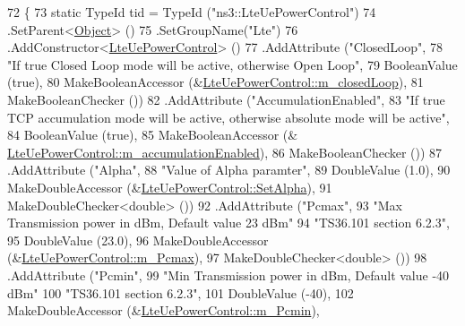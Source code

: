 \begin{DoxyCode}
72 \{
73   \textcolor{keyword}{static} TypeId tid = TypeId (\textcolor{stringliteral}{"ns3::LteUePowerControl"})
74     .SetParent<\hyperlink{classns3_1_1Object_a40860402e64d8008fb42329df7097cdb}{Object}> ()
75     .SetGroupName(\textcolor{stringliteral}{"Lte"})
76     .AddConstructor<\hyperlink{classns3_1_1LteUePowerControl_a98634f9063bfe469a1b025b6f6bbd02e}{LteUePowerControl}> ()
77     .AddAttribute (\textcolor{stringliteral}{"ClosedLoop"},
78                    \textcolor{stringliteral}{"If true Closed Loop mode will be active, otherwise Open Loop"},
79                    BooleanValue (\textcolor{keyword}{true}),
80                    MakeBooleanAccessor (&\hyperlink{classns3_1_1LteUePowerControl_a0bb35bbebbdd20c4c6140b984332367b}{LteUePowerControl::m\_closedLoop}),
81                    MakeBooleanChecker ())
82     .AddAttribute (\textcolor{stringliteral}{"AccumulationEnabled"},
83                    \textcolor{stringliteral}{"If true TCP accumulation mode will be active, otherwise absolute mode will be active"},
84                    BooleanValue (\textcolor{keyword}{true}),
85                    MakeBooleanAccessor (&
      \hyperlink{classns3_1_1LteUePowerControl_afb48a41c71eee57f8e624420aad0d073}{LteUePowerControl::m\_accumulationEnabled}),
86                    MakeBooleanChecker ())
87     .AddAttribute (\textcolor{stringliteral}{"Alpha"},
88                    \textcolor{stringliteral}{"Value of Alpha paramter"},
89                    DoubleValue (1.0),
90                    MakeDoubleAccessor (&\hyperlink{classns3_1_1LteUePowerControl_adca4253fbb3f2047ee1859a5b4bf0ca0}{LteUePowerControl::SetAlpha}),
91                    MakeDoubleChecker<double> ())
92     .AddAttribute (\textcolor{stringliteral}{"Pcmax"},
93                    \textcolor{stringliteral}{"Max Transmission power in dBm, Default value 23 dBm"}
94                    \textcolor{stringliteral}{"TS36.101 section 6.2.3"},
95                    DoubleValue (23.0),
96                    MakeDoubleAccessor (&\hyperlink{classns3_1_1LteUePowerControl_a0e0589a67d60c826259cd72149789b59}{LteUePowerControl::m\_Pcmax}),
97                    MakeDoubleChecker<double> ())
98     .AddAttribute (\textcolor{stringliteral}{"Pcmin"},
99                    \textcolor{stringliteral}{"Min Transmission power in dBm, Default value -40 dBm"}
100                    \textcolor{stringliteral}{"TS36.101 section 6.2.3"},
101                    DoubleValue (-40),
102                    MakeDoubleAccessor (&\hyperlink{classns3_1_1LteUePowerControl_ae0cff8633e8442bf356f409f303d5003}{LteUePowerControl::m\_Pcmin}),

\end{DoxyCode}
